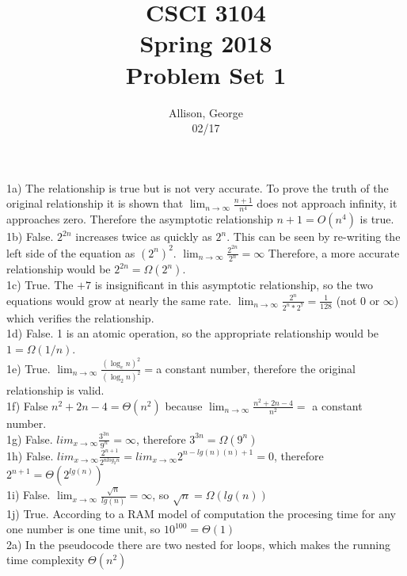 \documentclass{article}
\author{Allison, George\\02/17}
\title{CSCI 3104\\Spring 2018\\Problem Set 1}
\begin{document}
\maketitle
1a) The relationship is true but is not very accurate. To prove the truth of the original relationship it is shown that $\lim_{n\to\infty}\frac{n+1}{n^4}$ does not approach infinity, it approaches zero. Therefore the asymptotic relationship $n+1 = O(n^4)$ is true.\\

1b) False. $2^{2n}$ increases twice as quickly as $2^n$. This can be seen by re-writing the left side of the equation as $(2^n)^2$. $\lim_{n\to\infty} \frac{2^{2n}}{2^n} = \infty$ Therefore, a more accurate relationship would be $2^{2n} = \Omega(2^n)$.\\

1c) True. The $+7$ is insignificant in this asymptotic relationship, so the two equations would grow at nearly the same rate. $\lim_{n\to\infty}\frac{2^n}{2^n*2^7} = \frac{1}{128}$ (not $0$ or $\infty$) which verifies the relationship.\\

1d) False. 1 is an atomic operation, so the appropriate relationship would be $1 = \Omega(1/n)$.\\

1e) True. $\lim_{n\to\infty}\frac{(\log_{e}n)^2}{(\log_{2}n)^2} = $a constant number, therefore the original relationship is valid.\\

1f) False $n^2 + 2n - 4 = \Theta(n^2)$ because $\lim_{n\to\infty}\frac{ n^2+2n-4}{n^2} =$ a constant number.\\

1g) False. $lim_{x\to\infty}\frac{3^{3n}}{9^n} = \infty$, therefore $3^{3n} = \Omega(9^n)$\\

1h) False. $lim_{x\to\infty}\frac{2^{n+1}}{2^{nlog_{2}n}} = lim_{x\to\infty}2^{n-lg(n)(n)+1} = 0$, therefore $2^{n+1} = \Theta(2^{lg(n)})$\\

1i) False. $\lim_{x\to\infty}\frac{\sqrt{n}}{lg(n)} = \infty$, so $\sqrt{n} = \Omega(lg(n))$\\

1j) True. According to a RAM model of computation the procesing time for any one number is one time unit, so $10^{100} = \Theta(1)$\\

2a) In the pseudocode there are two nested for loops, which makes the running time complexity $\Theta(n^2)$\\
\end{document}
